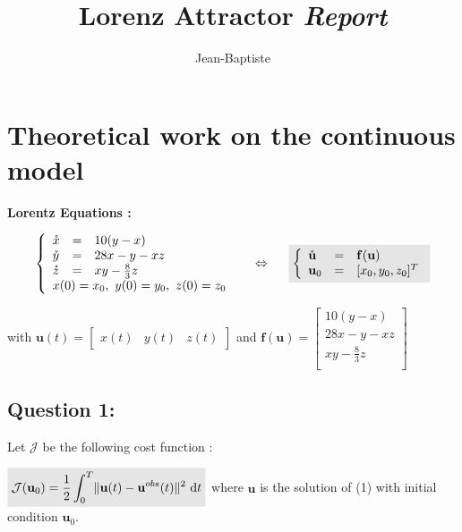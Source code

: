 \documentclass[11pt,a4paper]{article}
\title{
      \bsc{TP Inverse Methods}
      \vskip 1cm
      {\colorb\textbf{Lorenz Attractor}}
      \vskip 1cm
      \colorb\textit{Report}
  }
\author{%
    Jean-Baptiste \bsc{Keck}
    \vskip 0.5cm
    \bsc{M2 Msiam}
}
\makeatletter
\newcommand{\colora}{\color{Blue}}
\def\maketitle{%
    \begin{flushleft}
        \normalfont\LARGE\par
    \end{flushleft}
    \vskip 3cm
    \begin{center}%
        {\colora\specialrule{.2em}{0em}{0em}}
        \vskip 1cm
        {\Huge \@title}%
        \vskip 1cm
        {\colora\specialrule{.2em}{0em}{0em}}
        \vskip 5cm
        {\Huge \@author\par}%
        \vskip 2cm
        {\Huge \@date\par}%
        \vskip 1cm

    \end{center}%
    \clearpage
}
\renewcommand{\norm}[1]{\lVert #1 \rVert}
\renewcommand{\dt}{\ \mathrm{d}t}
\renewcommand{\u} {\mathbf{u}}
\renewcommand{\f} {\mathbf{f}}
\renewcommand{\ud}{\mathring{\mathbf{u}}}
\renewcommand{\uobs}{\mathbf{u}^{obs}}}
\renewcommand{\J}{\mathcal{J}}
\renewcommand{\colbox}[1]{\colorbox{lightgray}{$ #1 $}}
\makeatother
\begin{document}
\pagestyle{fancy}

\maketitle

\clearpage
\tableofcontents
\clearpage

\section{Theoretical work on the continuous model}

\textbf{Lorentz Equations :}
\vskip 0.2cm

$$
\begin{equation} \label{eq:lorentz}
\left \{
\begin{array}{l c l}
    \mathring{x} & = & 10(y - x)\\
    \mathring{y} & = & 28x - y -xz\\
    \mathring{z} & = & xy - \frac{8}{3}z\\
    \multicolumn{3}{l}{x(0) = x_0,\ y(0) = y_0,\ z(0) = z_0}
\end{array}
\right .
\hskip 0.5cm
\Leftrightarrow 
\hskip 0.5cm
\colbox{
\left \{
\begin{array}{l c l}
\ud&=&\f(\u) \\
\u_0&=&[x_0, y_0, z_0]^T
\end{array}
\right .
}
\end{equation}
$$

with $\u(t) = 
\left [
    \begin{array}{c}
        x(t)&
        y(t)&
        z(t)
    \end{array}
\right ]$
and $\f(\u) =
\left [
    \begin{array}{c}
        10(y - x)\\
        28x - y -xz\\
        xy - \frac{8}{3}z\\
    \end{array}
\right ]
$

\vskip 0.5cm
\subsection{Question 1:} 

\vskip 0.3cm
\noindent Let $\J$ be the following cost function :
\vskip 0.3cm

$\colbox{\J(\u_0) = \dfrac{1}{2}\displaystyle \int_0^T\norm{\u(t)-\uobs(t)}^2 \dt}$ where $\u$ is the solution of (1) with initial condition $\u_0$.
\end{document}
